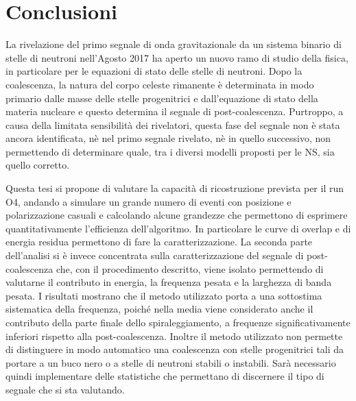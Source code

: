 \section*{Conclusioni}
La rivelazione del primo segnale di onda gravitazionale da un sistema binario di stelle di neutroni nell'Agosto 2017 ha aperto un nuovo ramo di studio della fisica, in particolare per le equazioni di stato delle stelle di neutroni. Dopo la coalescenza, la natura del corpo celeste rimanente è determinata in modo primario dalle masse delle stelle progenitrici e dall'equazione di stato della materia nucleare e questo determina il segnale di post-coalescenza. Purtroppo, a causa della limitata sensibilità dei rivelatori, questa fase del segnale non è stata ancora identificata, nè nel primo segnale rivelato, nè in quello successivo, non permettendo di determinare quale, tra i diversi modelli proposti per le NS, sia quello corretto.

Questa tesi si propone di valutare la capacità di ricostruzione prevista per il run O4, andando a simulare un grande numero di eventi con posizione e polarizzazione casuali e calcolando alcune grandezze che permettono di esprimere quantitativamente l'efficienza dell'algoritmo. In particolare le curve di overlap e di energia residua permettono di fare la caratterizzazione.
La seconda parte dell'analisi si è invece concentrata sulla caratterizzazione del segnale di post-coalescenza che, con il procedimento descritto, viene isolato permettendo di valutarne il contributo in energia, la frequenza pesata e la larghezza di banda pesata. I risultati mostrano che il metodo utilizzato porta a una sottostima sistematica della frequenza, poiché nella media viene considerato anche il contributo della parte finale dello spiraleggiamento, a frequenze significativamente inferiori rispetto alla post-coalescenza. Inoltre il metodo utilizzato non permette di distinguere in modo automatico una coalescenza con stelle progenitrici tali da portare a un buco nero o a stelle di neutroni stabili o instabili. Sarà necessario quindi implementare delle statistiche che permettano di discernere il tipo di segnale che si sta valutando.